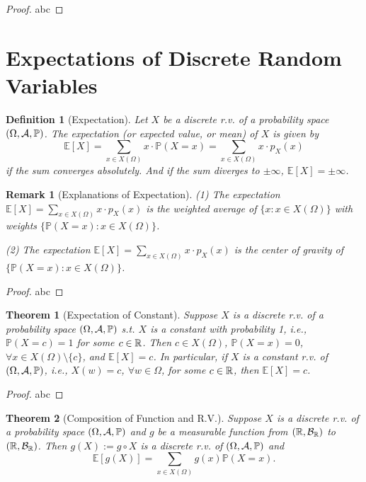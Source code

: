 \documentclass[openany,12pt]{book}
\newtheorem{theorem}{Theorem}[chapter]
\newtheorem{remark}{Remark}[chapter]
\newtheorem{definition}{Definition}[chapter]
\begin{document}
\begin{proof}
  abc
\end{proof}

\section{Expectations of Discrete Random Variables}

\begin{definition}[Expectation]
  Let $X$ be a discrete r.v. of a probability space $(\Omega,\mathcal{A},\mathbb{P})$. The expectation (or expected value, or mean) of $X$ is given by
  $$
    \mathbb{E}[X]=\sum_{x\in X(\Omega)}x\cdot \mathbb{P}(X=x)=\sum_{x\in X(\Omega)}x\cdot p_X(x)
  $$
  if the sum converges absolutely. And if the sum diverges to $\pm\infty$, $\mathbb{E}[X]=\pm\infty$.
\end{definition}

\begin{remark}[Explanations of Expectation]
  (1) The expectation $\mathbb{E}[X]=\sum_{x\in X(\Omega)}x\cdot p_X(x)$ is the weighted average of $\{x:x\in X(\Omega)\}$ with weights $\{\mathbb{P}(X=x): x\in X(\Omega)\}$.

  (2) The expectation $\mathbb{E}[X]=\sum_{x\in X(\Omega)}x\cdot p_X(x)$ is the center of gravity of $\{\mathbb{P}(X=x):x\in X(\Omega)\}$.
\end{remark}

\begin{proof}
  abc
\end{proof}

\begin{theorem}[Expectation of Constant]
  Suppose $X$ is a discrete r.v. of a probability space $(\Omega,\mathcal{A},\mathbb{P})$ s.t. $X$ is a constant with probability 1, i.e., $\mathbb{P}(X=c)=1$ for some $c\in\mathbb{R}$. Then $c\in X(\Omega)$, $\mathbb{P}(X=x)=0$, $\forall x\in X(\Omega)\setminus\{c\}$, and $\mathbb{E}[X]=c$. In particular, if $X$ is a constant r.v. of $(\Omega,\mathcal{A},\mathbb{P})$, i.e., $X(w)=c$, $\forall w\in\Omega$, for some $c\in\mathbb{R}$, then $\mathbb{E}[X]=c$.
\end{theorem}

\begin{proof}
  abc
\end{proof}

\begin{theorem}[Composition of Function and R.V.]
  Suppose $X$ is a discrete r.v. of a probability space $(\Omega,\mathcal{A},\mathbb{P})$ and $g$ be a measurable function from $(\mathbb{R},\mathcal{B}_{\mathbb{R}})$ to $(\mathbb{R},\mathcal{B}_{\mathbb{R}})$. Then $g(X):= g\circ X$ is a discrete r.v. of $(\Omega,\mathcal{A},\mathbb{P})$ and
  $$\mathbb{E}[g(X)]=\sum_{x\in X(\Omega)}g(x)\mathbb{P}(X=x).$$
\end{theorem}
\end{document}
